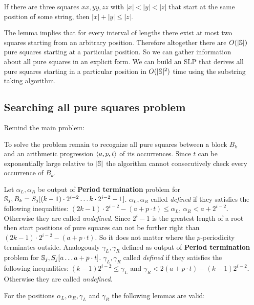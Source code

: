 ﻿\documentclass[11pt]{article}
\begin{document}
\begin{lem}[{\rm\cite{11}}]
If there are three squares $xx, yy, zz$ with $|x| < |y| < |z|$ that start at the same position of some string, then $|x|
+ |y| \leq |z|$.
\end{lem}

The lemma implies that for every interval of lengths there exist at most two squares starting from an arbitrary
position. Therefore altogether there are $O(|\mathbb{S}|)$ pure squares starting at a particular position. So we can
gather information about all pure squares in an explicit form. We can build an SLP that derives all pure squares
starting in a particular position in $O(|\mathbb{S}|^2)$ time using the substring taking algorithm.

\subsection{Searching all pure squares problem}

Remind the main problem:


To solve the problem remain to recognize all pure squares between a block $B_k$ and an arithmetic progression
$\langle a, p, t\rangle$ of its occurrences. Since $t$ can be exponentially large relative to $|\mathbb{S}|$ the algorithm
cannot consecutively check every occurrence of $B_k$.

Let $\alpha_L, \alpha_R$ be output of \textbf{Period termination} problem for $\mathbb{S}_j, B_k =
S_j[(k-1)\cdot2^{i-2}\dots k\cdot 2^{i-2} -1]$. $\alpha_L, \alpha_R$ called \emph{defined} if they satisfies
the following inequalities: $(2k-1)\cdot2^{i-2} - (a + p\cdot t) \leq \alpha_L$, $\alpha_R < a + 2^{i-2}$.
Otherwise they are called \emph{undefined}. Since $2^{i} - 1$ is the greatest length of a root then start
positions of pure squares can not be further right than $(2k-1)\cdot2^{i-2} - (a + p\cdot t)$. So it does not
matter where the $p$-periodicity terminates outside. Analogously $\gamma_L, \gamma_R$ defined as output of
\textbf{Period termination} problem for $\mathbb{S}_j, S_j[a\dots a + p\cdot t]$. $\gamma_L, \gamma_R$  called
\emph{defined} if they satisfies the following inequalities: $(k-1)2^{i-2} \leq \gamma_L$ and $\gamma_R < 2(a + p\cdot
t) - (k-1)2^{i-2}$. Otherwise they are called \emph{undefined}.

For the positions $\alpha_L, \alpha_R, \gamma_L$ and $\gamma_R$ the following lemmas are valid:
\end{document}
